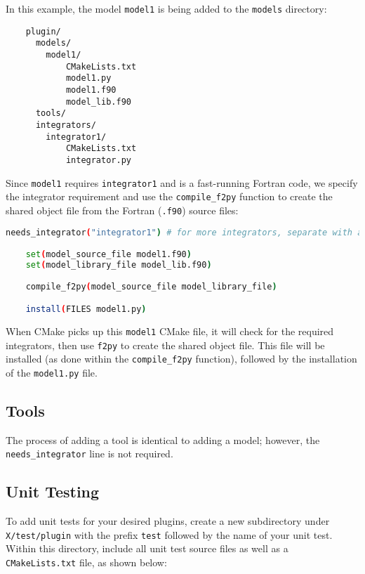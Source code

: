\documentclass[a4paper,12pt]{article}
\begin{document}
In this example, the model \texttt{model1} is being added to the \texttt{models} directory:

\begin{verbatim}
    plugin/
      models/
        model1/
            CMakeLists.txt 
            model1.py
            model1.f90
            model_lib.f90 
      tools/
      integrators/
        integrator1/
            CMakeLists.txt 
            integrator.py 
\end{verbatim}

Since \texttt{model1} requires \texttt{integrator1} and is a fast-running Fortran code, we specify the integrator requirement and use the \texttt{compile\_f2py} function to create the shared object file from the Fortran (\texttt{.f90}) source files:

\vspace{1em}
\begin{lstlisting}[language=bash]
    needs_integrator("integrator1") # for more integrators, separate with a space

    set(model_source_file model1.f90)
    set(model_library_file model_lib.f90)

    compile_f2py(model_source_file model_library_file)

    install(FILES model1.py)
\end{lstlisting}
\vspace{1em}

When CMake picks up this \texttt{model1} CMake file, it will check for the required integrators, then use \texttt{f2py} to create the shared object file. This file will be installed (as done within the \texttt{compile\_f2py} function), followed by the installation of the \texttt{model1.py} file.
\vspace{1em}

\subsection{Tools}

The process of adding a tool is identical to adding a model; however, the \texttt{needs\_integrator} line is not required.

\subsection{Unit Testing}

To add unit tests for your desired plugins, create a new subdirectory under \texttt{X/test/plugin} with the prefix \texttt{test} followed by the name of your unit test. Within this directory, include all unit test source files as well as a \texttt{CMakeLists.txt} file, as shown below:
\end{document}
